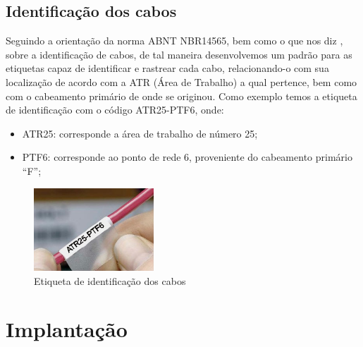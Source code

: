 \documentclass[	DIV=calc,%
							paper=a4,%
							fontsize=12pt,%
							onecolumn]{scrartcl}	 					%
\begin{document}
\subsection{Identificação dos cabos}
Seguindo a orientação da norma ABNT NBR14565, bem como o que nos diz \cite[Marin]{Marin}, sobre a identificação de cabos, de tal maneira desenvolvemos um padrão para as etiquetas capaz de identificar e rastrear cada cabo, relacionando-o com sua localização de acordo com a ATR (Área de Trabalho) a qual pertence, bem como com o cabeamento primário de onde se originou.
Como exemplo temos a etiqueta de identificação com o código ATR25-PTF6, onde: 
\begin{itemize}
\item ATR25: corresponde a área de trabalho de número 25;
\item PTF6: corresponde ao ponto de rede 6, proveniente do cabeamento primário “F”;
\end{itemize}
\begin{figure}[h!]
	\centering
	\includegraphics[width=0.4\textwidth, height=1\textheight, keepaspectratio=true]{figura8.jpg}
	\caption[Etiqueta de identificação dos cabos]{Etiqueta de identificação dos cabos}
	\label{figura8}
\end{figure}

\section{Implantação}

\end{document}
